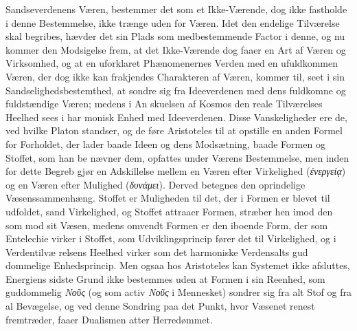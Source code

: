 \documentclass[12pt,a4paper]{book}
\newcommand{\gk}[1]{\textit{#1}}
\begin{document}
Sandseverdenens Væren, bestemmer det som et Ikke-Værende,
dog ikke fastholde i denne Bestemmelse, ikke trænge uden\-%
for Væren. Idet den endelige Tilværelse skal begribes,
hævder det sin Plads som medbestemmende Factor i denne,
og nu kommer den Modsigelse frem, at det Ikke-Værende dog
faaer en Art af Væren og Virksomhed, og at en uforklaret
Phænomenernes Verden med en ufuldkommen Væren, der dog
ikke kan frakjendes Charakteren af Væren, kommer til, seet i
sin Sandselighedsbestemthed, at sondre sig fra Ideeverdenen
med dens fuldkomne og fuldstændige Væren; medens i An\-%
skuelsen af Kosmos den reale Tilværelses Heelhed sees i har\-%
monisk Enhed med Ideeverdenen. Disse Vanskeligheder ere
de, ved hvilke Platon standser, og de føre Aristoteles til at
opstille en anden Formel for Forholdet, der lader baade Ideen
og dens Modsætning, baade Formen og Stoffet, som han be\-%
nævner dem, opfattes under Værens Bestemmelse, men inden\-%
for dette Begreb gjør en Adskillelse mellem en Væren efter
Virkelighed (\gk{ἐνεργείᾳ}) og en Væren efter Mulighed (\gk{δυνάμει}).
Derved betegnes den oprindelige Væsenssammenhæng. Stoffet
er Muligheden til det, der i Formen er blevet til udfoldet,
sand Virkelighed, og Stoffet attraaer Formen, stræber hen
imod den som mod sit Væsen, medens omvendt Formen er
den iboende Form, der som Entelechie virker i Stoffet, som
Udviklingsprincip fører det til Virkelighed, og i Verdentilvæ\-%
relsens Heelhed virker som det harmoniske Verdensalts gud\-%
dommelige Enhedsprincip. Men ogsaa hos Aristoteles kan
Systemet ikke afsluttes, Energiens sidste Grund ikke bestemmes
uden at Formen i sin Reenhed, som guddommelig \gk{Νοῦς} (og
som activ \gk{Νοῦς} i Mennesket) sondrer sig fra alt Stof og fra
al Bevægelse, og ved denne Sondring paa det Punkt, hvor
Væsenet renest fremtræder, faaer Dualismen atter Herredømmet.
\end{document}
